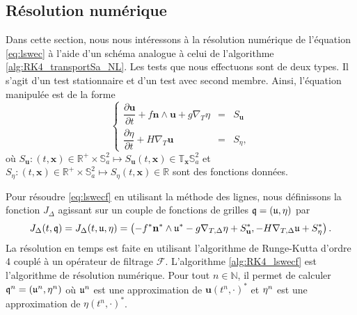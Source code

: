 











\subsection{Résolution numérique}

Dans cette section, nous nous intéressons à la résolution numérique de l'équation \eqref{eq:lswec} à l'aide d'un schéma analogue à celui de l'algorithme \ref{alg:RK4_transportSa_NL}. Les tests que nous effectuons sont de deux types. Il s'agit d'un test stationnaire et d'un test avec second membre. Ainsi, l'équation manipulée est de la forme
\begin{equation}
\left\lbrace
\begin{array}{rcl}
\dfrac{\partial \mathbf{u}}{\partial t} + f \mathbf{n} \wedge \mathbf{u} + g \nabla_T \eta & = & S_{\mathbf{u}} \\
\dfrac{\partial \eta}{\partial t} +  H \nabla_T \mathbf{u} & = & S_{\eta},
\end{array}
\right.
\label{eq:lswecf}
\end{equation}
où $S_{\mathbf{u}} : (t,\mathbf{x}) \in \mathbb{R}^+ \times \mathbb{S}_a^2 \mapsto S_{\mathbf{u}}(t,\mathbf{x}) \in \mathbb{T}_{\mathbf{x}} \mathbb{S}_a^2$ et $S_{\eta} : (t,\mathbf{x}) \in \mathbb{R}^+ \times \mathbb{S}_a^2 \mapsto S_{\eta}(t,\mathbf{x}) \in \mathbb{R}$ sont des fonctions données.

Pour résoudre \eqref{eq:lswecf} en utilisant la méthode des lignes, nous définissons la fonction $J_{\Delta}$ agissant sur un couple de fonctions de grilles $\mathfrak{q}=(\mathfrak{u},\mathbf{\eta})$ par 
\begin{equation}
J_{\Delta}(t,\mathfrak{q}) = J_{\Delta}(t,\mathfrak{u},\mathbf{\eta}) = \left( - f^* \mathbf{n}^* \wedge \mathfrak{u}^* - g \nabla_{T,\Delta} \mathbf{\eta} + S^*_{\mathbf{u}} , - H \nabla_{T,\Delta} \mathfrak{u} + S^*_{\eta} \right).
\end{equation}
La résolution en temps est faite en utilisant l'algorithme de Runge-Kutta d'ordre 4 couplé à un opérateur de filtrage $\mathcal{F}$. L'algorithme \ref{alg:RK4_lswecf} est l'algorithme de résolution numérique. Pour tout $n \in \mathbb{N}$, il permet de calculer $\mathfrak{q}^n = (\mathfrak{u}^n , \mathbf{\eta}^n)$ où $\mathfrak{u}^n$ est une approximation de $\mathbf{u}(t^n,\cdot)^*$ et $\mathbf{\eta}^n$ est une approximation de $\eta(t^n,\cdot)^*$.

